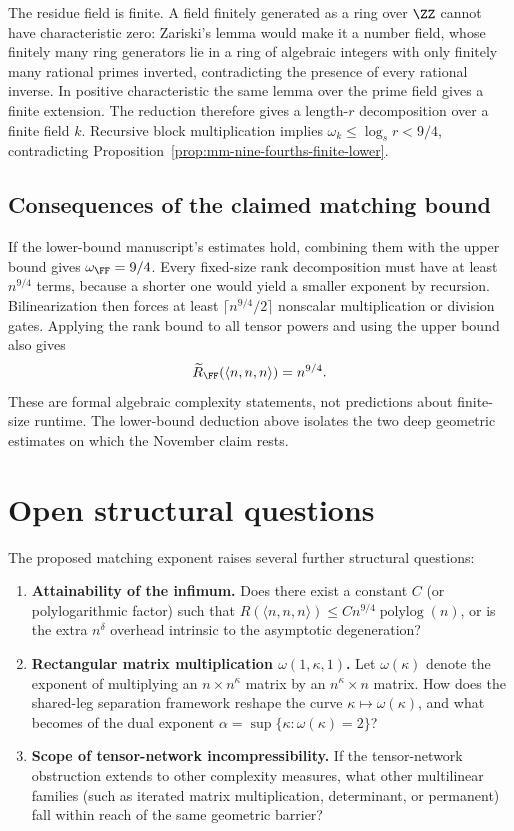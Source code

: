 The residue field is finite. A field finitely generated as a ring over \(\ZZ\) cannot have characteristic zero: Zariski's lemma would make it a number field, whose finitely many ring generators lie in a ring of algebraic integers with only finitely many rational primes inverted, contradicting the presence of every rational inverse. In positive characteristic the same lemma over the prime field gives a finite extension. The reduction therefore gives a length-\(r\) decomposition over a finite field \(k\). Recursive block multiplication implies \(\omega_k\leq\log_s r<9/4\), contradicting Proposition~\ref{prop:mm-nine-fourths-finite-lower}.

\subsection{Consequences of the claimed matching bound}

If the lower-bound manuscript's estimates hold, combining them with the upper bound gives \(\omega_\FF=9/4\). Every fixed-size rank decomposition must have at least \(n^{9/4}\) terms, because a shorter one would yield a smaller exponent by recursion. Bilinearization then forces at least \(\lceil n^{9/4}/2\rceil\) nonscalar multiplication or division gates. Applying the rank bound to all tensor powers and using the upper bound also gives
\[
 \widetilde R_\FF(\langle n,n,n\rangle)=n^{9/4}.
\]
These are formal algebraic complexity statements, not predictions about finite-size runtime. The lower-bound deduction above isolates the two deep geometric estimates on which the November claim rests.

\section{Open structural questions}

The proposed matching exponent raises several further structural questions:
\begin{enumerate}
  \item \textbf{Attainability of the infimum.} Does there exist a constant \(C\) (or polylogarithmic factor) such that \(R(\langle n, n, n \rangle) \le C n^{9/4} \operatorname{polylog}(n)\), or is the extra \(n^\delta\) overhead intrinsic to the asymptotic degeneration?
  \item \textbf{Rectangular matrix multiplication \(\omega(1, \kappa, 1)\).} Let \(\omega(\kappa)\) denote the exponent of multiplying an \(n \times n^\kappa\) matrix by an \(n^\kappa \times n\) matrix. How does the shared-leg separation framework reshape the curve \(\kappa \mapsto \omega(\kappa)\), and what becomes of the dual exponent \(\alpha = \sup\{\kappa : \omega(\kappa) = 2\}\)?
  \item \textbf{Scope of tensor-network incompressibility.} If the tensor-network obstruction extends to other complexity measures, what other multilinear families (such as iterated matrix multiplication, determinant, or permanent) fall within reach of the same geometric barrier?
\end{enumerate}
